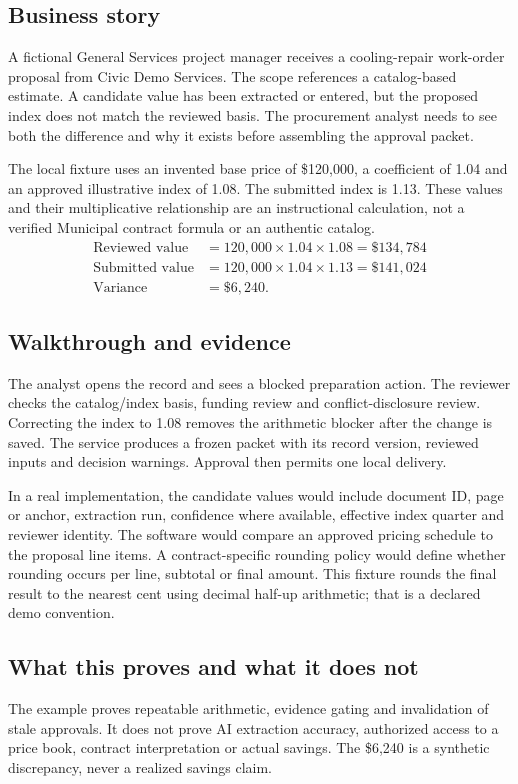 \documentclass[11pt,letterpaper]{article}
\begin{document}
\subsection{Business story}
A fictional General Services project manager receives a cooling-repair work-order proposal from Civic Demo Services. The scope references a catalog-based estimate. A candidate value has been extracted or entered, but the proposed index does not match the reviewed basis. The procurement analyst needs to see both the difference and why it exists before assembling the approval packet.

The local fixture uses an invented base price of \$120,000, a coefficient of 1.04 and an approved illustrative index of 1.08. The submitted index is 1.13. These values and their multiplicative relationship are an instructional calculation, not a verified Municipal contract formula or an authentic catalog.
\begin{align*}
\text{Reviewed value} &= 120{,}000\times1.04\times1.08=\$134{,}784\\
\text{Submitted value} &= 120{,}000\times1.04\times1.13=\$141{,}024\\
\text{Variance} &= \$6{,}240.
\end{align*}

\subsection{Walkthrough and evidence}
The analyst opens the record and sees a blocked preparation action. The reviewer checks the catalog/index basis, funding review and conflict-disclosure review. Correcting the index to 1.08 removes the arithmetic blocker after the change is saved. The service produces a frozen packet with its record version, reviewed inputs and decision warnings. Approval then permits one local delivery.

In a real implementation, the candidate values would include document ID, page or anchor, extraction run, confidence where available, effective index quarter and reviewer identity. The software would compare an approved pricing schedule to the proposal line items. A contract-specific rounding policy would define whether rounding occurs per line, subtotal or final amount. This fixture rounds the final result to the nearest cent using decimal half-up arithmetic; that is a declared demo convention.

\subsection{What this proves and what it does not}
The example proves repeatable arithmetic, evidence gating and invalidation of stale approvals. It does not prove AI extraction accuracy, authorized access to a price book, contract interpretation or actual savings. The \$6,240 is a synthetic discrepancy, never a realized savings claim.
\end{document}
